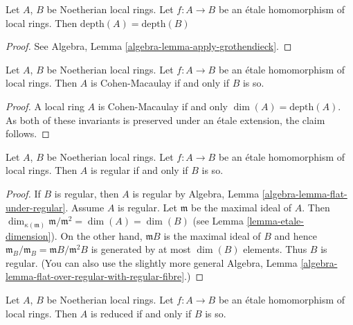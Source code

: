 \begin{proposition}
\label{proposition-etale-depth}
Let $A$, $B$ be Noetherian local rings.
Let $f : A \to B$ be an \'etale homomorphism of local rings.
Then $\text{depth}(A) = \text{depth}(B)$
\end{proposition}

\begin{proof}
See Algebra, Lemma \ref{algebra-lemma-apply-grothendieck}. 
\end{proof}

\begin{proposition}
\label{proposition-etale-CM}
Let $A$, $B$ be Noetherian local rings.
Let $f : A \to B$ be an \'etale homomorphism of local rings.
Then $A$ is Cohen-Macaulay if and only if $B$ is so.
\end{proposition}

\begin{proof}
A local ring $A$ is Cohen-Macaulay if and only $\dim(A) = \text{depth}(A)$.
As both of these invariants is preserved under an \'etale extension,
the claim follows.
\end{proof}

\begin{proposition}
\label{proposition-etale-regular}
Let $A$, $B$ be Noetherian local rings.
Let $f : A \to B$ be an \'etale homomorphism of local rings.
Then $A$ is regular if and only if $B$ is so.
\end{proposition}

\begin{proof}
If $B$ is regular, then $A$ is regular by
Algebra, Lemma \ref{algebra-lemma-flat-under-regular}.
Assume $A$ is regular. Let $\mathfrak m$ be the maximal ideal
of $A$. Then $\dim_{\kappa(\mathfrak m)} \mathfrak m/\mathfrak m^2 =
\dim(A) = \dim(B)$ (see Lemma \ref{lemma-etale-dimension}).
On the other hand, $\mathfrak mB$ is the maximal ideal of
$B$ and hence $\mathfrak m_B/\mathfrak m_B = \mathfrak mB/\mathfrak m^2B$
is generated by at most $\dim(B)$ elements. Thus $B$ is regular.
(You can also use the slightly more general
Algebra, Lemma \ref{algebra-lemma-flat-over-regular-with-regular-fibre}.)
\end{proof}


\begin{proposition}
\label{proposition-etale-reduced}
Let $A$, $B$ be Noetherian local rings.
Let $f : A \to B$ be an \'etale homomorphism of local rings.
Then $A$ is reduced if and only if $B$ is so.
\end{proposition}

